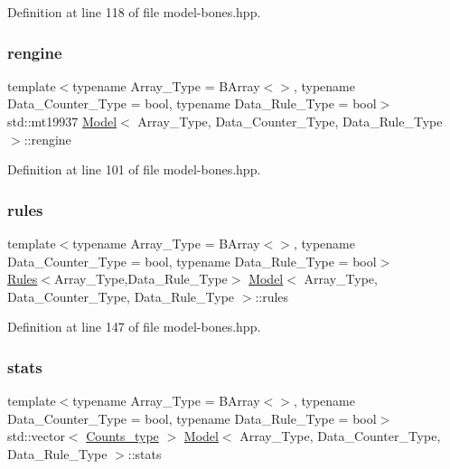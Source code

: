 Definition at line 118 of file model-\/bones.\+hpp.

\mbox{\label{class_model_afe20e82dca653b99e481d64b394299a2}} 
\subsubsection{\texorpdfstring{rengine}{rengine}}
{\footnotesize\ttfamily template$<$typename Array\+\_\+\+Type = B\+Array$<$$>$, typename Data\+\_\+\+Counter\+\_\+\+Type = bool, typename Data\+\_\+\+Rule\+\_\+\+Type = bool$>$ \\
std\+::mt19937 \hyperlink{class_model}{Model}$<$ Array\+\_\+\+Type, Data\+\_\+\+Counter\+\_\+\+Type, Data\+\_\+\+Rule\+\_\+\+Type $>$\+::rengine}



Definition at line 101 of file model-\/bones.\+hpp.

\mbox{\label{class_model_a65b96a73f8dba8a00cc767753aaca22b}} 
\subsubsection{\texorpdfstring{rules}{rules}}
{\footnotesize\ttfamily template$<$typename Array\+\_\+\+Type = B\+Array$<$$>$, typename Data\+\_\+\+Counter\+\_\+\+Type = bool, typename Data\+\_\+\+Rule\+\_\+\+Type = bool$>$ \\
\hyperlink{class_rules}{Rules}$<$Array\+\_\+\+Type,Data\+\_\+\+Rule\+\_\+\+Type$>$ \hyperlink{class_model}{Model}$<$ Array\+\_\+\+Type, Data\+\_\+\+Counter\+\_\+\+Type, Data\+\_\+\+Rule\+\_\+\+Type $>$\+::rules}



Definition at line 147 of file model-\/bones.\+hpp.

\mbox{\label{class_model_abd7e36250a681bd2ade69d087e8200e1}} 
\subsubsection{\texorpdfstring{stats}{stats}}
{\footnotesize\ttfamily template$<$typename Array\+\_\+\+Type = B\+Array$<$$>$, typename Data\+\_\+\+Counter\+\_\+\+Type = bool, typename Data\+\_\+\+Rule\+\_\+\+Type = bool$>$ \\
std\+::vector$<$ \hyperlink{typedefs_8hpp_aee40fa17c1fddb63dd1f2b1470ade95b}{Counts\+\_\+type} $>$ \hyperlink{class_model}{Model}$<$ Array\+\_\+\+Type, Data\+\_\+\+Counter\+\_\+\+Type, Data\+\_\+\+Rule\+\_\+\+Type $>$\+::stats}



